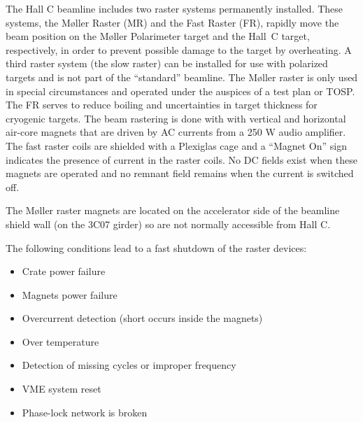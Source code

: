 


\begin{safetyen}{0}{0}

The Hall C beamline includes two raster systems permanently installed.
These systems, the M\o ller Raster (MR) and the Fast Raster (FR),
rapidly move the beam position on the M\o ller Polarimeter target and
the Hall~C target, respectively, in order to prevent possible damage
to the target by overheating. A third raster system (the slow raster)
can be installed for use with polarized targets and is not part of the
``standard'' beamline. The M\o ller raster is only used in special
circumstances and operated under the auspices of a test plan or
TOSP. The FR serves to reduce boiling and uncertainties in target
thickness for cryogenic targets.  The beam rastering is done with with
vertical and horizontal air-core magnets that are driven by AC
currents from a 250 W audio amplifier. The fast raster coils are
shielded with a Plexiglas cage and a ``Magnet On'' sign indicates the
presence of current in the raster coils.
No DC fields exist when these magnets are operated and no remnant
field remains when the current is switched off.

The M\o ller raster magnets are located on the accelerator side of the
beamline shield wall (on the 3C07 girder) so are not normally
accessible from Hall C.

The following conditions lead to a fast shutdown of the raster devices:
\begin{itemize}
\item{Crate power failure}
\item{Magnets power failure}
\item{Overcurrent detection (short occurs inside the magnets)}
\item{Over temperature}
\item{Detection of missing cycles or improper frequency}
\item{VME system reset}
\item{Phase-lock network is broken}
\end{itemize}


\end{safetyen}
